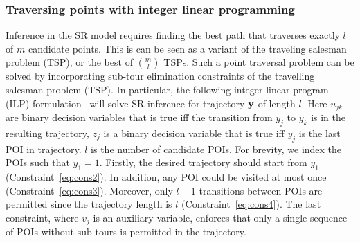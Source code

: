 \subsubsection{Traversing points with integer linear programming}
Inference in the SR model requires finding the best path that traverses exactly $l$ of $m$ candidate points.
This is can be seen as a variant of the traveling salesman problem (TSP), or the best of ${m \choose l}$ TSPs.
Such a point traversal problem can be solved by incorporating
sub-tour elimination constraints of the travelling salesman problem (TSP).
In particular, the following integer linear program (ILP) formulation~\cite{ijcai15,cikm16paper}
will solve SR inference for trajectory $\mathbf{y}$ of length $l$.
Here $u_{jk}$ are binary decision variables that is true iff the transition from $y_j$ to $y_k$ is in the resulting trajectory,
$z_j$ is a binary decision variable that is true iff $y_j$ is the last POI in trajectory.
$l$ is the number of candidate POIs.
For brevity, we index the POIs such that $y_1 = 1$.
Firstly, the desired trajectory should start from $y_1$ (Constraint~\ref{eq:cons2}).
In addition, any POI could be visited at most once (Constraint~\ref{eq:cons3}).
Moreover, only $l-1$ transitions between POIs are permitted
since the trajectory length is $l$ (Constraint~\ref{eq:cons4}).
The last constraint, where $v_j$ is an auxiliary variable,
enforces that only a single sequence of POIs without sub-tours is permitted in the trajectory.

